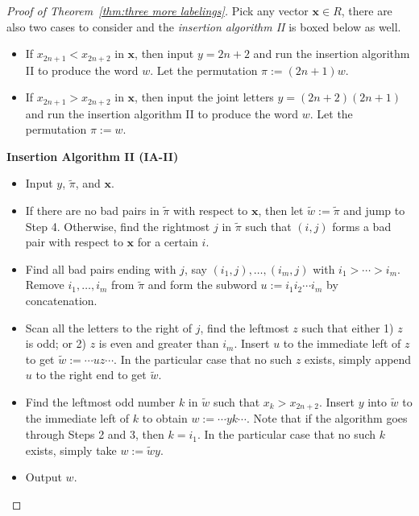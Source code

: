 \documentclass[11pt,reqno]{amsart}
\numberwithin{equation}{section}
\theoremstyle{plain}
\theoremstyle{definition}
\newcommand{\bx}{\mathbf{x}}
\begin{document}
\begin{proof}[Proof of Theorem~\ref{thm:three more labelings}]
 	Pick any vector $\bx\in R$, there are also two cases to consider and the {\it insertion algorithm II} is boxed below as well.
    \begin{itemize}
    	\item If $x_{2n+1}<x_{2n+2}$ in $\bx$, then input $y=2n+2$ and run the insertion algorithm II to produce the word $w$. Let the permutation $\pi:=(2n+1)w$.
    	\item If $x_{2n+1}>x_{2n+2}$ in $\bx$, then input the joint letters $y=(2n+2)(2n+1)$ and run the insertion algorithm II to produce the word $w$. Let the permutation $\pi:=w$.
    \end{itemize}
    \begin{framed}
    	\begin{center}
    		{\bf Insertion Algorithm II (IA-II)}
    	\end{center}
    	\begin{itemize}
    		\item[Initiate] Input $y$, $\tilde{\pi}$, and $\bx$.
    		\item[Step 1] If there are no bad pairs in $\tilde{\pi}$ with respect to $\bx$, then let $\tilde{w}:=\tilde{\pi}$ and jump to Step 4. Otherwise, find the rightmost $j$ in $\tilde{\pi}$ such that $(i,j)$ forms a bad pair with respect to $\bx$ for a certain $i$.
    		\item[Step 2] Find all bad pairs ending with $j$, say $(i_1,j),\ldots,(i_m,j)$ with $i_1>\cdots>i_m$. Remove $i_1,\ldots,i_m$ from $\tilde{\pi}$ and form the subword $u:=i_1 i_2 \cdots i_m$ by concatenation.
    		\item[Step 3] Scan all the letters to the right of $j$, find the leftmost $z$ such that either 1) $z$ is odd; or 2) $z$ is even and greater than $i_m$. Insert $u$ to the immediate left of $z$ to get $\tilde{w}:=\cdots uz\cdots$. In the particular case that no such $z$ exists, simply append $u$ to the right end to get $\tilde{w}$. 
    		\item[Step 4] Find the leftmost odd number $k$ in $\tilde{w}$ such that $x_k>x_{2n+2}$. Insert $y$ into $\tilde{w}$ to the immediate left of $k$ to obtain $w:=\cdots yk\cdots$. Note that if the algorithm goes through Steps 2 and 3, then $k=i_1$. In the particular case that no such $k$ exists, simply take $w:=\tilde{w}y$.
    		\item[End] Output $w$.
    	\end{itemize}
    \end{framed}
    

\end{proof}
\end{document}
